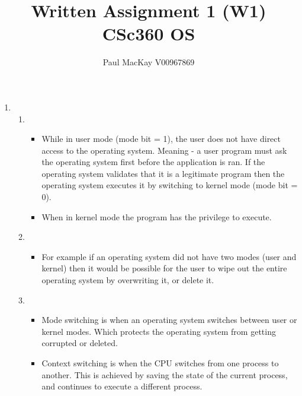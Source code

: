 \documentclass{article} %
\title{Written Assignment 1 (W1) CSc360 OS}
\author{Paul MacKay V00967869}
\begin{document}
\maketitle

\begin{enumerate}
    \item
        \begin{enumerate}[label=(\alph*)]
            \item
                \begin{itemize}
                    \item While in user mode (mode bit = 1), the user does not have direct access to the 
                        operating system. Meaning - a user program must ask the operating system
                        first before the application is ran. If the operating system validates that
                        it is a legitimate program then the operating system executes it by 
                        switching to kernel mode (mode bit = 0).
                    \item When in kernel mode the program has the privilege to execute. 
                \end{itemize}
                \hfill
            \item
                \begin{itemize}
                    \item For example if an operating system did not have two modes
                        (user and kernel) then it would be possible for the user
                        to wipe out the entire operating system by overwriting 
                        it, or delete it.
                \end{itemize}
                \hfill
            \item
                \begin{itemize}
                    \item Mode switching is when an operating system switches between 
                        user or kernel modes. Which protects the operating system from
                        getting corrupted or deleted.
                    \item   
                        Context switching is when the CPU switches from one process to another.
                        This is achieved by saving the state of the current process, and 
                        continues to execute a different process.
                \end{itemize}
                \hfill

\end{enumerate}
\end{enumerate}
\end{document}
